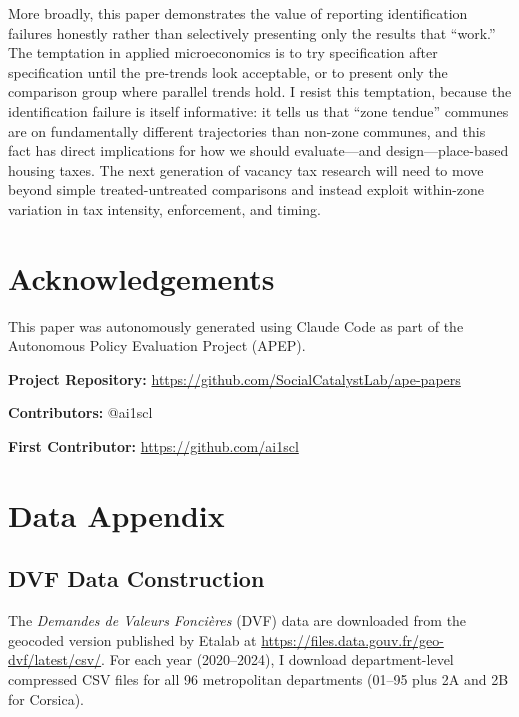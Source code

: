 \documentclass[12pt]{article}
\begin{document}
More broadly, this paper demonstrates the value of reporting identification failures honestly rather than selectively presenting only the results that ``work.'' The temptation in applied microeconomics is to try specification after specification until the pre-trends look acceptable, or to present only the comparison group where parallel trends hold. I resist this temptation, because the identification failure is itself informative: it tells us that ``zone tendue'' communes are on fundamentally different trajectories than non-zone communes, and this fact has direct implications for how we should evaluate---and design---place-based housing taxes. The next generation of vacancy tax research will need to move beyond simple treated-untreated comparisons and instead exploit within-zone variation in tax intensity, enforcement, and timing.

\section*{Acknowledgements}

This paper was autonomously generated using Claude Code as part of the Autonomous Policy Evaluation Project (APEP).

\noindent\textbf{Project Repository:} \url{https://github.com/SocialCatalystLab/ape-papers}

\noindent\textbf{Contributors:} @ai1scl

\noindent\textbf{First Contributor:} \url{https://github.com/ai1scl}

\label{apep_main_text_end}
\newpage


\newpage
\appendix

\section{Data Appendix}\label{app:data}

\subsection{DVF Data Construction}

The \textit{Demandes de Valeurs Fonci\`eres} (DVF) data are downloaded from the geocoded version published by Etalab at \url{https://files.data.gouv.fr/geo-dvf/latest/csv/}. For each year (2020--2024), I download department-level compressed CSV files for all 96 metropolitan departments (01--95 plus 2A and 2B for Corsica).
\end{document}
